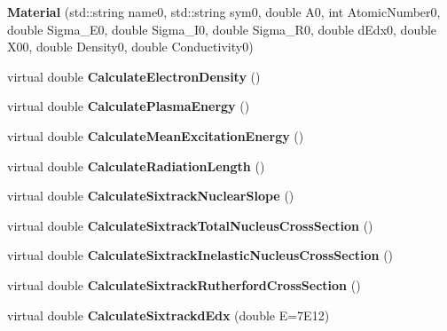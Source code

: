 \begin{DoxyCompactItemize}
\item 
\mbox{\label{classMaterial_a407362b1d7771e24ebaa794461b4ba5f}} 
{\bfseries Material} (std\+::string name0, std\+::string sym0, double A0, int Atomic\+Number0, double Sigma\+\_\+\+E0, double Sigma\+\_\+\+I0, double Sigma\+\_\+\+R0, double d\+Edx0, double X00, double Density0, double Conductivity0)
\item 
\mbox{\label{classMaterial_a0391844350344c114d9a73554a81403b}} 
virtual double {\bfseries Calculate\+Electron\+Density} ()
\item 
\mbox{\label{classMaterial_a77283d66fdb3795231343ddb1ae2229d}} 
virtual double {\bfseries Calculate\+Plasma\+Energy} ()
\item 
\mbox{\label{classMaterial_a21fb580d741582d3193ac3fa8d3297d0}} 
virtual double {\bfseries Calculate\+Mean\+Excitation\+Energy} ()
\item 
\mbox{\label{classMaterial_a11140942dec2dd470b54815734a142b2}} 
virtual double {\bfseries Calculate\+Radiation\+Length} ()
\item 
\mbox{\label{classMaterial_a7be9f69f91ff80e0a2a874f3f968bdf8}} 
virtual double {\bfseries Calculate\+Sixtrack\+Nuclear\+Slope} ()
\item 
\mbox{\label{classMaterial_ab51b54426a98338a7c41c09669293ca3}} 
virtual double {\bfseries Calculate\+Sixtrack\+Total\+Nucleus\+Cross\+Section} ()
\item 
\mbox{\label{classMaterial_a44fe9ec847b2927b03faf537d3a8320a}} 
virtual double {\bfseries Calculate\+Sixtrack\+Inelastic\+Nucleus\+Cross\+Section} ()
\item 
\mbox{\label{classMaterial_a09a9216d47645a63563383f440f57df0}} 
virtual double {\bfseries Calculate\+Sixtrack\+Rutherford\+Cross\+Section} ()
\item 
\mbox{\label{classMaterial_a427f44e15033c186cc6bb8461e5f6598}} 
virtual double {\bfseries Calculate\+Sixtrackd\+Edx} (double E=7\+E12)

\end{DoxyCompactItemize}
